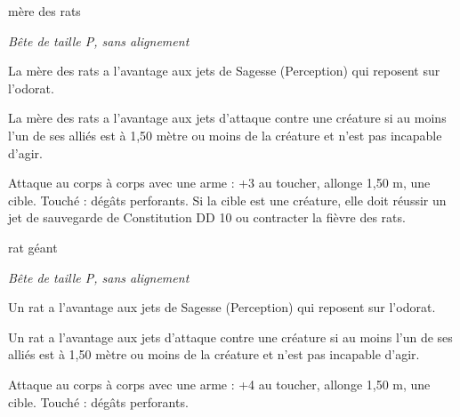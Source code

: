 \documentclass[a4paper,10pt,openany]{book}
\begin{document}
\begin{multicols}{2}
\begin{monsterbox}{mère des rats}
	\begin{hangingpar}
		\textit{Bête de taille P, sans alignement}
	\end{hangingpar}
	\dndline%
	\basics[%
	armorclass = 13,
	hitpoints  = \dice{4d6+8},
	speed      = 9 m
	]
	\dndline%
	\stats[
	STR = \stat{9},
	DEX = \stat{17},
	CON = \stat{14},
	INT = \stat{2},
	CHA = \stat{3}
	]
	\dndline%
	\details[%
	senses={Vision dans le noir à 9 m, Perception passive 10},
	challenge= 1/4
	]
	\dndline%
	\begin{monsteraction}
		La mère des rats a l’avantage aux jets de Sagesse (Perception) qui reposent sur l’odorat.
	\end{monsteraction}
	\begin{monsteraction}
		La mère des rats a l’avantage aux jets d’attaque contre une créature si au moins l’un de ses alliés est à 1,50 mètre ou moins de la créature et
		n’est pas incapable d’agir.
	\end{monsteraction}
	\begin{monsteraction}[Morsure]
		Attaque au corps à corps avec une arme : +3 au toucher, allonge 1,50 m, une cible. Touché :  dégâts perforants. Si la cible est une
		créature, elle doit réussir un jet de sauvegarde de Constitution DD 10 ou contracter la fièvre des rats.
	\end{monsteraction}
\end{monsterbox}

\begin{monsterbox}{rat géant}
	\begin{hangingpar}
		\textit{Bête de taille P, sans alignement}
	\end{hangingpar}
	\dndline%
	\basics[%
	armorclass = 12,
	hitpoints  = \dice{2d6},
	speed      = 9 m
	]
	\dndline%
	\stats[
	STR = \stat{7},
	DEX = \stat{15},
	CON = \stat{11},
	INT = \stat{2},
	CHA = \stat{3}
	]
	\dndline%
	\details[%
	senses={Vision dans le noir à 9 m, Perception passive 10},
	challenge= 1/8
	]
	\dndline%
	\begin{monsteraction}
		Un rat a l’avantage aux jets de Sagesse (Perception) qui reposent sur l’odorat.
	\end{monsteraction}
	\begin{monsteraction}
		Un rat a l’avantage aux jets d’attaque contre une créature si au moins l’un de ses alliés est à 1,50 mètre ou moins de la créature et n’est pas
		incapable d’agir.
	\end{monsteraction}
	\begin{monsteraction}[Morsure]
		Attaque au corps à corps avec une arme : +4 au toucher, allonge 1,50 m, une cible. Touché :  dégâts perforants.
	\end{monsteraction}
\end{monsterbox}


\end{multicols}
\end{document}
